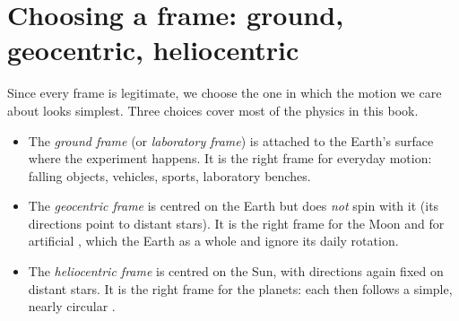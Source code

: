 \section{Choosing a frame: ground, geocentric, heliocentric}

Since every frame is legitimate, we choose the one in which the motion we
care about looks simplest. Three choices cover most of the physics in
this book.

\begin{definition}\label{def:g10:relative-motion:frames}
\begin{itemize}
  \item The \emph{ground frame} (or
        \emph{laboratory frame}) is attached to
        the Earth's surface where the experiment happens. It is the
        right frame for everyday motion: falling objects, vehicles,
        sports, laboratory benches.
  \item The \emph{geocentric frame} is centred
        on the Earth but does \emph{not} spin with it (its directions
        point to distant stars). It is the right frame for the Moon and
        for artificial , which  the Earth as a whole and
        ignore its daily rotation.
  \item The \emph{heliocentric frame} is
        centred on the Sun, with directions again fixed on distant
        stars. It is the right frame for the planets: each then follows
        a simple, nearly circular .
\end{itemize}
\end{definition}

